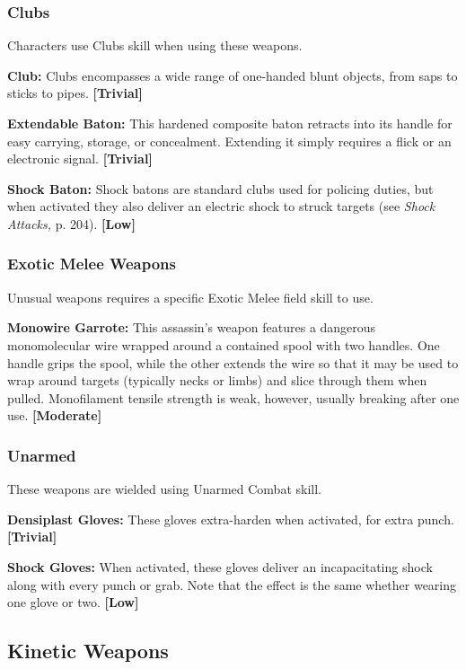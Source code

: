 \subsubsection{Clubs}

Characters use Clubs skill when using these weapons.

\textbf{Club:} Clubs encompasses a wide range of one-handed
blunt objects, from saps to sticks to pipes. \textbf{[Trivial]}

\textbf{Extendable Baton:} This hardened composite baton 
retracts into its handle for easy carrying, storage, or 
concealment. Extending it simply requires a flick or 
an electronic signal. \textbf{[Trivial]}

\textbf{Shock Baton:} Shock batons are standard clubs 
used for policing duties, but when activated they also 
deliver an electric shock to struck targets (see \textit{Shock }
\textit{Attacks,} p. 204). \textbf{[Low]}

\subsubsection{Exotic Melee Weapons}

Unusual weapons requires a specific Exotic Melee 
field skill to use.

\textbf{Monowire Garrote:} This assassin's weapon features
a dangerous monomolecular wire wrapped
around a contained spool with two handles. One 
handle grips the spool, while the other extends the 
wire so that it may be used to wrap around targets 
(typically necks or limbs) and slice through them 
when pulled. Monofilament tensile strength is weak, 
however, usually breaking after one use. \textbf{[Moderate]}

\subsubsection{Unarmed}

These weapons are wielded using Unarmed Combat skill.

\textbf{Densiplast Gloves:} These gloves extra-harden when 
activated, for extra punch. \textbf{[Trivial]}

\textbf{Shock Gloves:} When activated, these gloves deliver 
an incapacitating shock along with every punch or 
grab. Note that the effect is the same whether wearing 
one glove or two. \textbf{[Low]}

\subsection{Kinetic Weapons}

